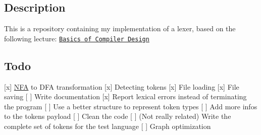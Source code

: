 \subsection*{Description}

This is a repository containing my implementation of a lexer, based on the following lecture\+: \href{http://hjemmesider.diku.dk/~torbenm/Basics/basics_lulu2.pdf}{\tt Basics of Compiler Design}

\subsection*{Todo}

\mbox{[}x\mbox{]} \hyperlink{classNFA}{N\+FA} to D\+FA transformation \mbox{[}x\mbox{]} Detecting tokens \mbox{[}x\mbox{]} File loading \mbox{[}x\mbox{]} File saving \mbox{[} \mbox{]} Write documentation \mbox{[}x\mbox{]} Report lexical errors instead of terminating the program \mbox{[} \mbox{]} Use a better structure to represent token types \mbox{[} \mbox{]} Add more infos to the tokens payload \mbox{[} \mbox{]} Clean the code \mbox{[} \mbox{]} (Not really related) Write the complete set of tokens for the test language \mbox{[} \mbox{]} Graph optimization 